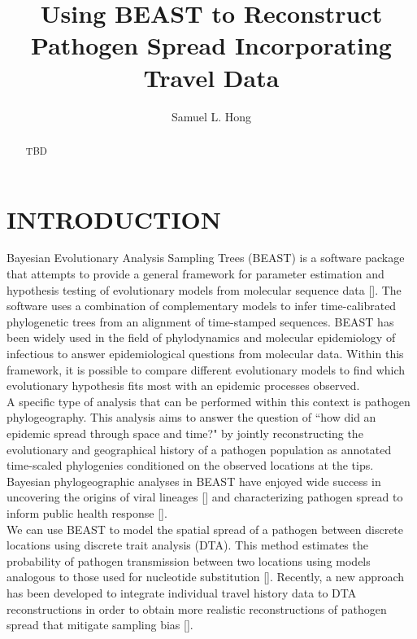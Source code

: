 \documentclass{article}
\title{Using BEAST to Reconstruct Pathogen Spread Incorporating Travel Data}
\author{Samuel L. Hong}
\begin{document}
\maketitle

\begin{abstract}
\begin{adjustwidth}{0.5cm}{0.5cm}
TBD 
\end{adjustwidth}
\end{abstract}

\section*{INTRODUCTION}

Bayesian Evolutionary Analysis Sampling Trees (BEAST) is a software package \cite{beast110} that attempts to provide a general framework for parameter estimation and hypothesis testing of evolutionary models from molecular sequence data [\cite{beastOG,beast17,beast110}]. The software uses a combination of complementary models to infer time-calibrated phylogenetic trees from an alignment of time-stamped sequences. BEAST has been widely used in the field of phylodynamics and molecular epidemiology of infectious to answer epidemiological questions from molecular data. Within this framework, it is possible to compare different evolutionary models to find which evolutionary hypothesis fits most with an epidemic processes observed. \\

A specific type of analysis that can be performed within this context is pathogen phylogeography. This analysis aims to answer the question of ``how did an epidemic spread through space and time?" by jointly reconstructing the evolutionary and geographical history of a pathogen population as annotated time-scaled phylogenies conditioned on the observed locations at the tips. Bayesian phylogeographic analyses in BEAST have enjoyed wide success in uncovering the origins of viral lineages [\cite{hiv}] and characterizing pathogen spread to inform public health response [\cite{ebola}]. \\

We can use BEAST to model the spatial spread of a pathogen between discrete locations using discrete trait analysis (DTA). This method estimates the probability of pathogen transmission between two locations using models analogous to those used for nucleotide substitution [\cite{dta}]. Recently, a new approach has been developed to integrate individual travel history data to DTA reconstructions in order to obtain more realistic reconstructions of pathogen spread that mitigate sampling bias [\cite{travhist}]. \\
\end{document}
